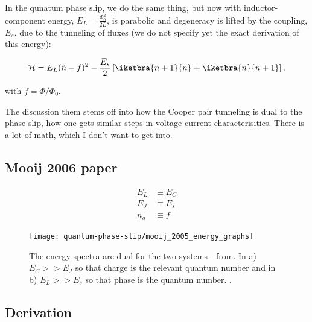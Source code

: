  \noindent In the qunatum phase slip, we do the same thing, but now with
 inductor-component energy, $ E_L  = \frac{\Phi_0^2}{2L} $, is parabolic
 and degeneracy is lifted by the coupling, $ E_s $, due to the tunneling
 of fluxes (we do not specify yet the exact derivation of this energy):

 \begin{equation}\label{eq:hamiltonian-cqps-standalone}
   \mathcal{H} = E_L(\hat{n} - f)^2 - \frac{E_s}{2}\left[\iketbra{n+1}{n} + \iketbra{n}{n+1}\right],
 \end{equation}

 \noindent with $ f = \Phi/\Phi_0 $.

 \begin{framed}\noindent
   \noindent  The discussion  them stems  off into  how the  Cooper pair
   tunneling is  dual to the phase  slip, how one gets  similar steps in
   voltage current  characterisitics. There  is a lot  of math,  which I
   don't want to get into.
 \end{framed}

 \subsection{Mooij 2006 paper \cite{mooij2005}}
 \label{sec:mooij-2006-paper}

 \begin{equation}
   \begin{aligned}
     E_{L} & \equiv E_C\\
     E_{J} & \equiv E_s \\
     n_{g} & \equiv f
   \end{aligned}
 \end{equation}

 \noindent


\begin{figure}[h]
  \centering
  \texttt{[image: quantum-phase-slip/mooij\_2005\_energy\_graphs]}
  \caption{\small  The energy  spectra are  dual for  the two  systems -
    from. In  a) $E_C  >> E_J$  so that charge  is the  relevant quantum
    number  and  in  b) $E_L  >>  E_s$  so  that  phase is  the  quantum
    number. \cite{mooij2005}. \label{fig:mooij_2005_energy_graphs}}
\end{figure}

\subsection{Derivation}
\label{sec:derivation}

